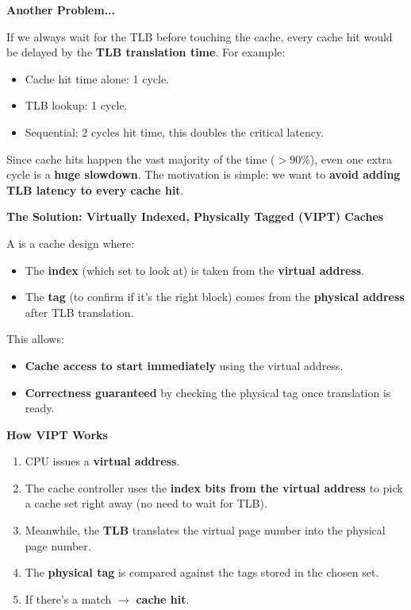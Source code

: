 \begin{flushleft}
    \textcolor{Red2}{ \textbf{Another Problem...}}
\end{flushleft}
If we always wait for the TLB before touching the cache, every cache hit would be delayed by the \textbf{TLB translation time}. For example:
\begin{itemize}
    \item Cache hit time alone: 1 cycle.
    \item TLB lookup: 1 cycle.
    \item Sequential: 2 cycles hit time, this doubles the critical latency.
\end{itemize}
Since cache hits happen the vast majority of the time ($> 90\%$), even one extra cycle is a \textbf{huge slowdown}. The motivation is simple: we want to \textbf{avoid adding TLB latency to every cache hit}.

\highspace
\begin{flushleft}
    \textcolor{Green3}{ \textbf{The Solution: Virtually Indexed, Physically Tagged (VIPT) Caches}}
\end{flushleft}
A  is a cache design where:
\begin{itemize}
    \item The \textbf{index} (which set to look at) is taken from the \textbf{virtual address}.
    \item The \textbf{tag} (to confirm if it's the right block) comes from the \textbf{physical address} after TLB translation.
\end{itemize}
This allows:
\begin{itemize}
    \item[\textcolor{Green3}{\faIcon{check}}] \textbf{Cache access to start immediately} using the virtual address.
    \item[\textcolor{Green3}{\faIcon{check}}] \textbf{Correctness guaranteed} by checking the physical tag once translation is ready.
\end{itemize}

\highspace
\begin{flushleft}
    \textcolor{Green3}{ \textbf{How VIPT Works}}
\end{flushleft}
\begin{enumerate}
    \item CPU issues a \textbf{virtual address}.
    \item The cache controller uses the \textbf{index bits from the virtual address} to pick a cache set right away (no need to wait for TLB).
    \setcounter{enumi}{\theenumi}
    \item Meanwhile, the \textbf{TLB} translates the virtual page number into the physical page number.
    \item The \textbf{physical tag} is compared against the tags stored in the chosen set.
    \item If there's a match $\rightarrow$ \textbf{cache hit}.
\end{enumerate}

